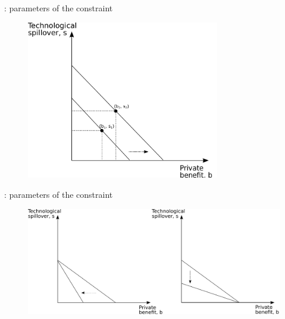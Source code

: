 \documentclass[14pt]{beamer}
\begin{document}
\begin{frame}{\secname: parameters of the constraint}
\begin{figure}
	\centering
    \includegraphics[width=0.75\textwidth, height=0.75\textheight,keepaspectratio]{../figure/budget_constraint}
    \label{fig:budget_constraint}
\end{figure}
\end{frame}

\begin{frame}{\secname: parameters of the constraint}
\begin{figure}
	\centering
    \includegraphics[width=\textwidth, height=\textheight,keepaspectratio]{../figure/absorptive_capacity}
    \label{fig:relative_price}
\end{figure}
\end{frame}
\end{document}
